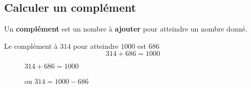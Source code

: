 \begin{pageCours} 

\section{Calculer un complément}

\begin{minipage}{0.6\linewidth}
\begin{Def}
Un \textbf{complément} est un nombre à \textbf{ajouter} pour atteindre un nombre donné.
\end{Def}

\begin{Ex}
Le complément à $314$ pour atteindre $1000$ est $686$
\[314+686=1000\]
\begin{description}
\item[]  $314 + 686 = 1000$
\item[] ou  $314 = 1000 - 686$
\end{description}
\end{Ex}

\end{minipage}
\begin{minipage}{0.4\linewidth}


\end{minipage}
\end{pageCours}
